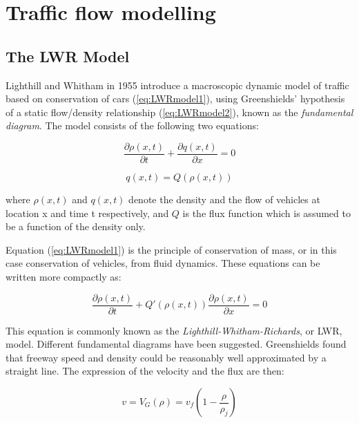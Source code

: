 \documentclass[11pt]{article}
\numberwithin{equation}{section}
\numberwithin{figure}{section}
\numberwithin{table}{section}
\begin{document}
\section{Traffic flow modelling}

\subsection{The LWR Model}

Lighthill and Whitham in 1955 \cite{Lighthill1955} introduce a macroscopic dynamic model of traffic based on conservation of cars (\ref{eq:LWRmodel1}), using Greenshields' hypothesis \cite{Greenshields1934} of a static flow/density relationship (\ref{eq:LWRmodel2}), known as the \textit{fundamental diagram}. The model consists of the following two equations:

\begin{equation} \label{eq:LWRmodel1}
\frac{\partial \rho(x,t)}{\partial t} + \frac{\partial q(x,t)}{\partial x} = 0
\end{equation}

\begin{equation} \label{eq:LWRmodel2}
q(x,t) = Q(\rho(x,t))
\end{equation}

\noindent where $\rho(x,t)$ and $q(x,t)$ denote the density and the flow of vehicles at location x and time t respectively, and $Q$ is the flux function which is assumed to be a function of the density only. 

Equation (\ref{eq:LWRmodel1}) is the principle of conservation of mass, or in this case conservation of vehicles, from fluid dynamics. These equations can be written more compactly as:

\begin{equation} \label{eq:LWRmodel3}
\frac{\partial \rho(x,t)}{\partial t} + Q'(\rho(x,t))\frac{\partial \rho(x,t)}{\partial x} = 0
\end{equation}

This equation is commonly known as the \textit{Lighthill-Whitham-Richards}, or LWR, model. Different fundamental diagrams have been suggested. Greenshields \cite{Greenshields1934} found that freeway speed and density could be reasonably well approximated by a straight line. The expression of the velocity and the flux are then:

\begin{equation} \label{eq:greenshieldsVelocity}
v = V_{G}(\rho) = v_{f}(1-\frac{\rho}{\rho_{j}})
\end{equation}
\end{document}
